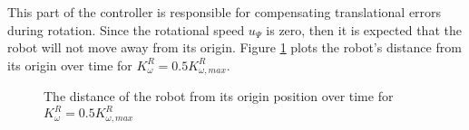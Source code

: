 This part of the controller is responsible for compensating translational errors
during rotation. Since the rotational speed $u_{\Psi}$ is zero, then it is
expected that the robot will not move away from its origin. Figure
\ref{fig:10_0.5_max} plots the robot's distance from its origin over time for
$K_{\omega}^R = 0.5 K_{\omega, max}^R$.

\begin{figure}[H]\centering
  \scalebox{0.8}{}
  \caption{The distance of the robot from its origin position over time for
    $K_{\omega}^R = 0.5 K_{\omega, max}^R$}
  \label{fig:10_0.5_max}
\end{figure}
